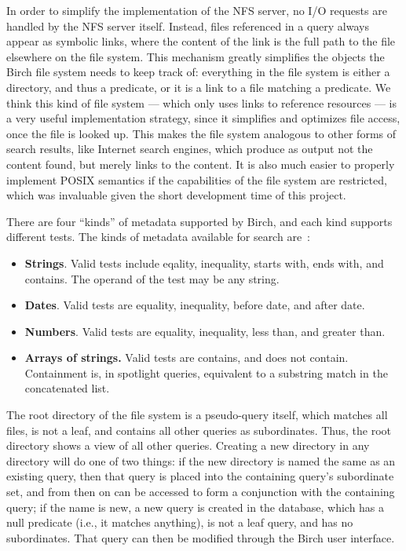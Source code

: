 \documentclass{article}
\begin{document}
In order to simplify the implementation of the NFS server, no I/O
requests are handled by the NFS server itself. Instead, files
referenced in a query always appear as symbolic links, where the
content of the link is the full path to the file elsewhere on the file
system. This mechanism greatly simplifies the objects the Birch file
system needs to keep track of: everything in the file system is either
a directory, and thus a predicate, or it is a link to a file matching
a predicate. We think this kind of file system --- which only uses
links to reference resources --- is a very useful implementation
strategy, since it simplifies and optimizes file access, once the file
is looked up. This makes the file system analogous to other forms of
search results, like Internet search engines, which produce as output
not the content found, but merely links to the content. It is also
much easier to properly implement POSIX semantics if the capabilities
of the file system are restricted, which was invaluable given the
short development time of this project.

There are four ``kinds'' of metadata supported by Birch, and each kind
supports different tests. The kinds of metadata available for search
are~\cite{appleref:spotlight-metadata}:

\begin{itemize}
  \item\textbf{Strings}. Valid tests include eqality, inequality,
    starts with, ends with, and contains. The operand of the test may
    be any string.

  \item\textbf{Dates}. Valid tests are equality, inequality, before
    date, and after date.

  \item\textbf{Numbers}. Valid tests are equality, inequality, less
    than, and greater than.

  \item\textbf{Arrays of strings.} Valid tests are contains, and does
    not contain. Containment is, in spotlight queries, equivalent to a
    substring match in the concatenated list.
\end{itemize}

The root directory of the file system is a pseudo-query itself, which
matches all files, is not a leaf, and contains all other queries as
subordinates. Thus, the root directory shows a view of all other
queries. Creating a new directory in any directory will do one of two
things: if the new directory is named the same as an existing query,
then that query is placed into the containing query's subordinate set,
and from then on can be accessed to form a conjunction with the
containing query; if the name is new, a new query is created in the
database, which has a null predicate (i.e., it matches anything), is
not a leaf query, and has no subordinates. That query can then be
modified through the Birch user interface.
\end{document}
